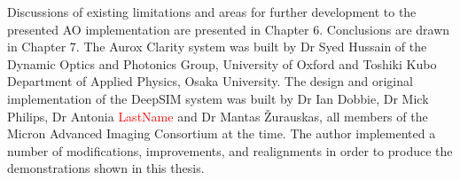 Discussions of existing limitations and areas for further development to the 
presented AO implementation are presented in Chapter 6. Conclusions are drawn 
in Chapter 7. The Aurox Clarity system was built by Dr Syed Hussain of the 
Dynamic Optics and Photonics Group, University of Oxford and Toshiki Kubo
Department of Applied Physics, Osaka University. The design and original 
implementation of the DeepSIM system was built by Dr Ian Dobbie, Dr Mick 
Philips, Dr Antonia \textcolor{red}{LastName} and Dr Mantas \v{Z}urauskas, 
all members of the Micron Advanced Imaging Consortium at the time. The author 
implemented a number of modifications, improvements, and realignments in 
order to produce the demonstrations shown in this thesis.